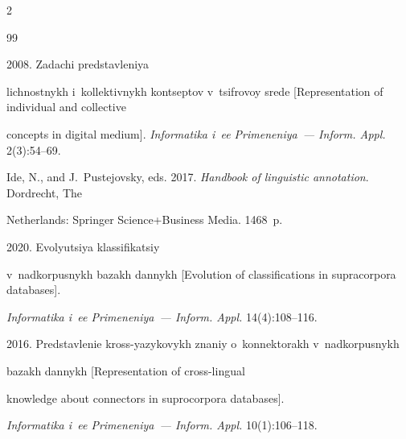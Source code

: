   \begin{multicols}{2}





\renewcommand{\bibname}{\protect\rmfamily References}







{\small\frenchspacing


 {%




 \begin{thebibliography}{99}




 2008. Zadachi predstavleniya 


lichnostnykh i~kollektivnykh kontseptov v~tsifrovoy srede [Representation of individual and collective 


concepts in digital medium]. \textit{Informatika i~ee Primeneniya~--- Inform. Appl.} 2(3):54--69.




Ide, N., and J.~Pustejovsky, eds. 2017. \textit{Handbook of linguistic annotation}. Dordrecht, The 


Netherlands: Springer Science\;+\;Business Media. 1468~p.




 2020. Evolyutsiya klassifikatsiy 


v~nadkorpusnykh ba\-zakh dannykh [Evolution of classifications in supracorpora databases]. 


\textit{Informatika i~ee Primeneniya~--- Inform. Appl.} 14(4):108--116.






 2016. Predstavlenie kross-yazykovykh znaniy o~konnektorakh v~nadkorpusnykh 


 bazakh dannykh [Representation of cross-lingual 


knowledge about connectors in suprocorpora databases]. 


\textit{Informatika i~ee Primeneniya~--- Inform. Appl.} 10(1):106--118.



\end{thebibliography}}}
\end{multicols}
